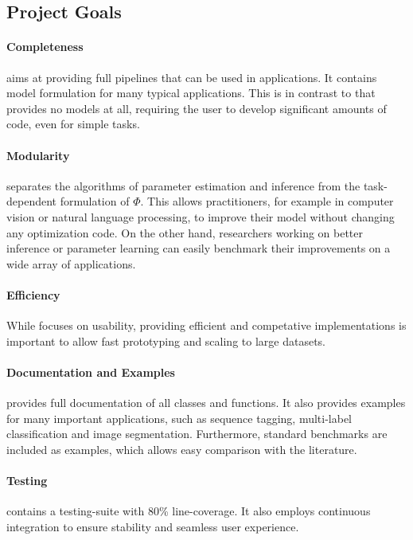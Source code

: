 \subsection{Project Goals}\label{sec:goals}

\paragraph{Completeness}\pystruct aims at providing full pipelines that can be
    used in applications. It contains model formulation for many typical
    applications.  This is in contrast to \svmstruct that provides no
    models at all, requiring the user to develop significant amounts of code, even
    for simple tasks.

\paragraph{Modularity} \pystruct separates the algorithms of parameter estimation and
     inference from the task-dependent formulation of $\Phi$. This allows
     practitioners, for example in computer vision or natural language
     processing, to improve their model without changing any optimization
     code. On the other hand, researchers working on better inference or
     parameter learning can easily benchmark their improvements on a wide
     array of applications.

\paragraph{Efficiency}
     While \pystruct focuses on usability, providing efficient and competative
     implementations is important to allow fast prototyping and scaling to
     large datasets.

\paragraph{Documentation and Examples}
     \pystruct provides full documentation of all classes and functions.  It
     also provides examples for many important applications, such as
     sequence tagging, multi-label classification and image segmentation.
     Furthermore, standard benchmarks are included as examples, which allows
     easy comparison with the literature.

\paragraph{Testing}
     \pystruct contains a testing-suite with 80\% line-coverage. It also employs continuous integration
     to ensure stability and seamless user experience.

